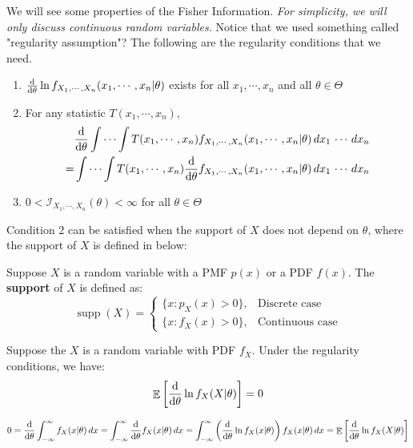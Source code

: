 \documentclass{huhtakm-template-book-v2}
\DeclareMathOperator{\E}{\mathbb{E}}
\DeclareMathOperator{\supp}{supp}
\begin{document}
\newpage
We will see some properties of the Fisher Information. \textit{For simplicity, we will only discuss continuous random variables.} Notice that we used something called "regularity assumption"? The following are the regularity conditions that we need.
\begin{enumerate}
	\item $\odv*{}{\theta}\ln{f_{X_{1},\cdots,X_{n}}}(x_{1},\cdots,x_{n}|\theta)$ exists for all $x_{1},\cdots,x_{n}$ and all $\theta\in\Theta$
	\item For any statistic $T(x_{1},\cdots,x_{n})$,
	\begin{align*}
		&\odv*{}{\theta}\int\cdots\int T(x_{1},\cdots,x_{n})f_{X_{1},\cdots,X_{n}}(x_{1},\cdots,x_{n}|\theta)\,dx_{1}\,\cdots\,dx_{n}\\
		=&\int\cdots\int T(x_{1},\cdots,x_{n})\odv*{}{\theta}f_{X_{1},\cdots,X_{n}}(x_{1},\cdots,x_{n}|\theta)\,dx_{1}\,\cdots\,dx_{n}
	\end{align*}
	\item $0<\mathcal{I}_{X_{1},\cdots,X_{n}}(\theta)<\infty$ for all $\theta\in\Theta$
\end{enumerate}
Condition 2 can be satisfied when the support of $X$ does not depend on $\theta$, where the support of $X$ is defined in below:
\begin{defn}
	Suppose $X$ is a random variable with a PMF $p(x)$ or a PDF $f(x)$. The \textbf{support} of $X$ is defined as:
	\begin{equation*}
		\supp(X)=\begin{cases}
			\{x:p_{X}(x)>0\}, &\text{Discrete case}\\
			\{x:f_{X}(x)>0\}, &\text{Continuous case}
		\end{cases}
	\end{equation*}
\end{defn}
\begin{lem}
	\label{Chapter 2 (Lemma) Expectation of Fisher Information but with first moment is zero}
	Suppose the $X$ is a random variable with PDF $f_{X}$. Under the regularity conditions, we have:
	\begin{equation*}
		\E\left[\odv*{}{\theta}\ln{f_{X}(X|\theta)}\right]=0
	\end{equation*}
\end{lem}
\begin{proofing}
	\begin{equation*}
		0=\odv*{}{\theta}\intinfty f_{X}(x|\theta)\,dx=\intinfty\odv*{}{\theta}f_{X}(x|\theta)\,dx=\intinfty\left(\odv*{}{\theta}\ln{f_{X}(x|\theta)}\right)f_{X}(x|\theta)\,dx=\E\left[\odv*{}{\theta}\ln{f_{X}(X|\theta)}\right]
	\end{equation*}
\end{proofing}
\end{document}
